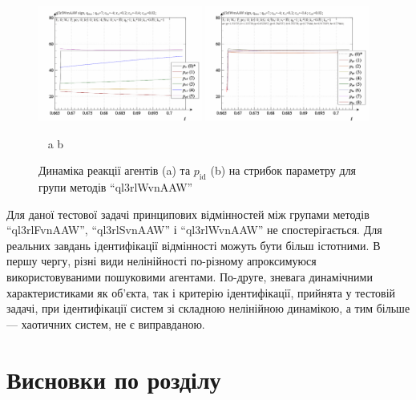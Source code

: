 \begin{figure}[htb!]
  \begin{center}
    \includegraphics[width=0.48\textwidth]{p/sign/qls-p_t_pi_m_ql3rlWvnAAW_sign.png}
    \hfill
    \includegraphics[width=0.48\textwidth]{p/sign/qls-p_t_p_m_ql3rlWvnAAW_sign.png}
  \end{center}
  \vspace{-1.0ex}
  \begin{center}
    ~ \hfill a \hfill\hfill b  \hfill ~
  \end{center}
  \vspace{-1.5ex}
  \caption{Динаміка реакції агентів (a) та $p_\mathrm{id}$ (b) на стрибок параметру для групи методів ``ql3rlWvnAAW''}
  \label{atu:f:ql3rlWvnAAW_sign}
\end{figure}

Для даної тестової задачі принципових відмінностей між групами методів
``ql3rlFvnAAW'', ``ql3rlSvnAAW'' і ``ql3rlWvnAAW'' не спостерігається. Для
реальних завдань ідентифікації відмінності можуть бути більш істотними.
%
В першу чергу, різні види нелінійності по-різному
апроксимуюся використовуваними пошуковими
агентами. По-друге, зневага динамічними характеристиками як
об'єкта, так і критерію ідентифікації, прийнята у тестовій
задачі, при ідентифікації систем зі складною нелінійною
динамікою, а тим більше --- хаотичних систем, не є виправданою.





\section{Висновки по розділу \thechapter} %

